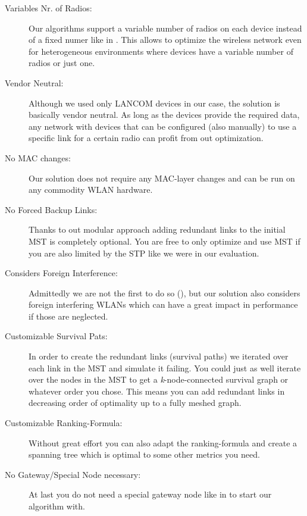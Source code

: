       \begin{description}
	\item [Variables Nr. of Radios:] Our algorithms support a variable number of radios on each device instead of a fixed numer like in \cite{INSTC}. 
	  This allows to optimize the wireless network even for heterogeneous environments where devices have a variable number of radios or just one.
	\item [Vendor Neutral:] Although we used only LANCOM devices in our case, the solution is basically vendor neutral. As long as the devices provide the required data,
	  any network with devices that can be configured (also manually) to use a specific link for a certain radio can profit from out optimization.
	\item [No MAC changes:] Our solution does not require any \ac{MAC}-layer changes and can be run on any commodity \ac{WLAN} hardware.
	\item [No Forced Backup Links:] Thanks to out modular approach adding redundant links to the initial \ac{MST} is completely optional. 
	  You are free to only optimize and use MST if you are also limited by the STP like we were in our evaluation.
	\item [Considers Foreign Interference:] Admittedly we are not the first to do so (\cite{BFS-CA}), but our solution also considers foreign interfering WLANs which can have a great impact in performance
	  if those are neglected.
	\item [Customizable Survival Pats:] In order to create the redundant links (survival paths) we iterated over each link in the MST and simulate it failing.
	  You could just as well iterate over the nodes in the MST to get a \textit{k}-node-connected survival graph or whatever order you chose.
	  This means you can add redundant links in decreasing order of optimality up to a fully meshed graph.
	\item [Customizable Ranking-Formula:] Without great effort you can also adapt the ranking-formula and create a spanning tree which is optimal to some other metrics you need.
	\item [No Gateway/Special Node necessary:] At last you do not need a special gateway node like in \cite{BFS-CA} to start our algorithm with.
      \end{description}